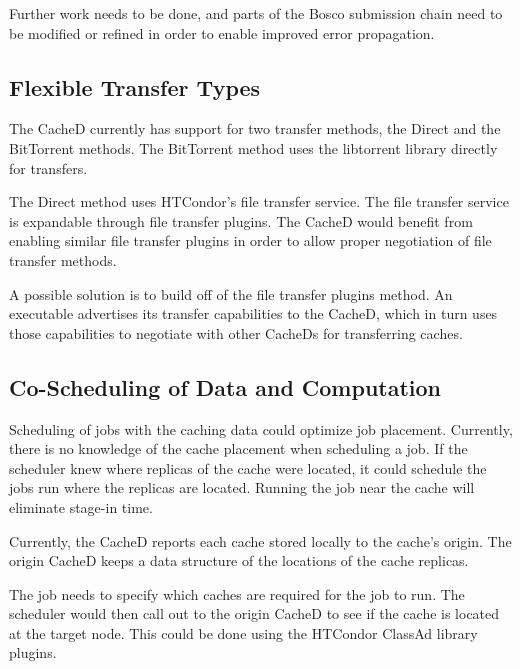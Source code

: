 Further work needs to be done, and parts of the Bosco submission chain need to be modified or refined in order to enable improved error propagation.

\subsection{Flexible Transfer Types}

The CacheD currently has support for two transfer methods, the Direct and the BitTorrent methods.  The BitTorrent method uses the libtorrent library directly for transfers.

The Direct method uses HTCondor's file transfer service.  The file transfer service is expandable through file transfer plugins.  The CacheD would benefit from enabling similar file transfer plugins in order to allow proper negotiation of file transfer methods.

A possible solution is to build off of the file transfer plugins method.  An executable advertises its transfer capabilities to the CacheD, which in turn uses those capabilities to negotiate with other CacheDs for transferring caches.


\subsection{Co-Scheduling of Data and Computation}

Scheduling of jobs with the caching data could optimize job placement.  Currently, there is no knowledge of the cache placement when scheduling a job.  If the scheduler knew where replicas of the cache were located, it could schedule the jobs run where the replicas are located.  Running the job near the cache will eliminate stage-in time.

Currently, the CacheD reports each cache stored locally to the cache's origin. The origin CacheD keeps a data structure of the locations of the cache replicas.

The job needs to specify which caches are required for the job to run.  The scheduler would then call out to the origin CacheD to see if the cache is located at the target node.  This could be done using the HTCondor ClassAd library plugins.








